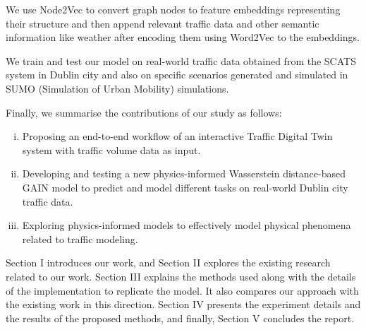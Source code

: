 We use Node2Vec\cite{node2vec} to convert graph nodes to feature embeddings representing their structure and then append relevant traffic data and other semantic information like weather after encoding them using Word2Vec\cite{word2vec} to the embeddings. 

We train and test our model on real-world traffic data obtained from the SCATS\cite{scats} system in Dublin city and also on specific scenarios generated and simulated in SUMO\cite{sumo} (Simulation of Urban Mobility) simulations.

Finally, we summarise the contributions of our study as follows:
\begin{enumerate}[(i)]
  \item Proposing an end-to-end workflow of an interactive Traffic Digital Twin system with traffic volume data as input.
  \item Developing and testing a new physics-informed Wasserstein distance-based GAIN model to predict and model different tasks on real-world Dublin city traffic data.
  \item Exploring physics-informed models to effectively model physical phenomena related to traffic modeling.
\end{enumerate}

Section I introduces our work, and Section II explores the existing research related to our work. Section III explains the methods used along with the details of the implementation to replicate the model. It also compares our approach with the existing work in this direction. Section IV presents the experiment details and the results of the proposed methods, and finally, Section V concludes the report.